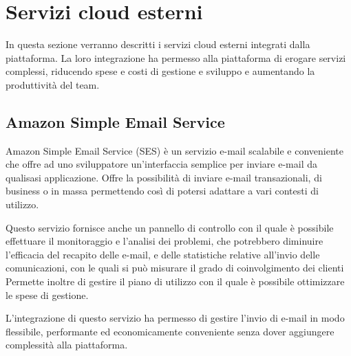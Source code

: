 \section{Servizi cloud esterni}
In questa sezione verranno descritti i servizi cloud esterni integrati dalla piattaforma.
La loro integrazione ha permesso alla piattaforma di erogare servizi complessi, riducendo spese e costi
di gestione e sviluppo e aumentando la produttività del team.

\subsection{Amazon Simple Email Service}
Amazon Simple Email Service \cite{AWS-SES} (SES) è un servizio e-mail scalabile e conveniente che
offre ad uno sviluppatore un'interfaccia semplice per inviare e-mail da qualisasi applicazione.
Offre la possibilità di inviare e-mail transazionali, di business o in massa permettendo così
di potersi adattare a vari contesti di utilizzo.

Questo servizio fornisce anche un pannello di controllo con il quale è possibile effettuare il monitoraggio e l'analisi dei
problemi, che potrebbero diminuire l'efficacia del recapito delle e-mail, e delle statistiche
relative all'invio delle comunicazioni, con le quali si può misurare il grado di coinvolgimento dei clienti
Permette inoltre di gestire il piano di utilizzo con il quale è possibile ottimizzare le spese di gestione.

L'integrazione di questo servizio ha permesso di gestire l'invio di e-mail in modo flessibile, performante ed economicamente
conveniente senza dover aggiungere complessità alla piattaforma.